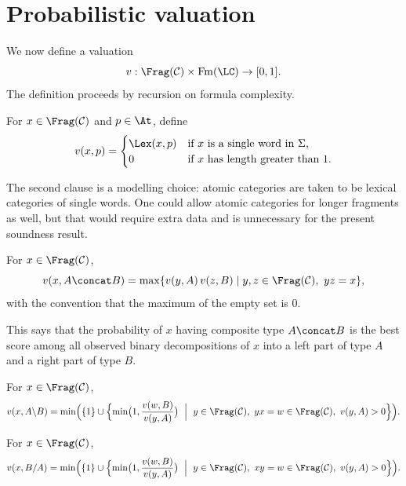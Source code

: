 \section{Probabilistic valuation}
We now define a valuation
\[
v : \Frag(\mathcal C) \times \mathrm{Fm}(\LC) \to [0,1].
\]
The definition proceeds by recursion on formula complexity.

\begin{definition}
For $x \in \Frag(\mathcal C)$ and $p \in \At$, define
\[
v(x,p) =
\begin{cases}
\Lex(x,p) & \text{if $x$ is a single word in $\Sigma$,}\\
0 & \text{if $x$ has length greater than $1$.}
\end{cases}
\]
\end{definition}

The second clause is a modelling choice: atomic categories are taken to be lexical categories of
single words. One could allow atomic categories for longer fragments as well, but that would
require extra data and is unnecessary for the present soundness result.

\begin{definition}[Product]
For $x \in \Frag(\mathcal C)$,
\[
v(x,A\concat B)
= \max\{v(y,A)\,v(z,B) \mid y,z \in \Frag(\mathcal C),\ yz=x\},
\]
with the convention that the maximum of the empty set is $0$.
\end{definition}

This says that the probability of $x$ having composite type $A\concat B$ is the best score among
all observed binary decompositions of $x$ into a left part of type $A$ and a right part of type
$B$.

\begin{definition}
For $x \in \Frag(\mathcal C)$,
\[
v(x,A\backslash B)
= \min\Bigl(\{1\} \cup
\Bigl\{\min\bigl(1,\frac{v(w,B)}{v(y,A)}\bigr)
\ \Bigm|\ y \in \Frag(\mathcal C),\ yx=w \in \Frag(\mathcal C),\ v(y,A)>0\Bigr\}\Bigr).
\]
\end{definition}

\begin{definition}
For $x \in \Frag(\mathcal C)$,
\[
v(x,B/A)
= \min\Bigl(\{1\} \cup
\Bigl\{\min\bigl(1,\frac{v(w,B)}{v(y,A)}\bigr)
\ \Bigm|\ y \in \Frag(\mathcal C),\ xy=w \in \Frag(\mathcal C),\ v(y,A)>0\Bigr\}\Bigr).
\]
\end{definition}

